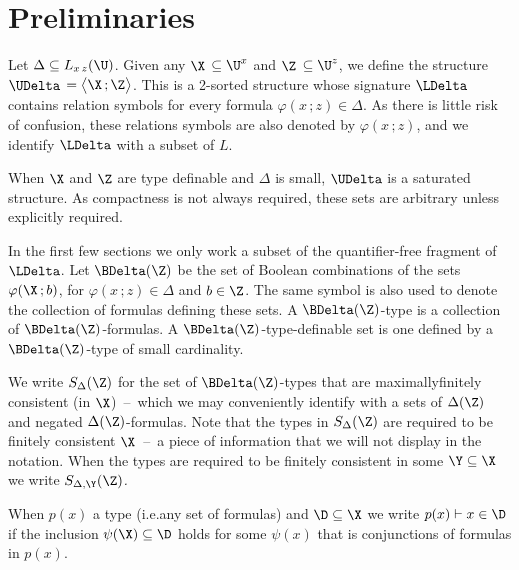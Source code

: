 \section{Preliminaries}
\label{actions}

\def\ceq#1#2#3{\noindent\parbox[t]{15ex}{$\displaystyle #1$}\parbox{6ex}{\hfil $#2$}{$\displaystyle #3$}}


Let $\Delta\subseteq L_{x\,z}(\U)$.
Given any \emph{$\X$\/} $\subseteq\U^x$ and \emph{$\Z$\/} $\subseteq\U^z$, we define the structure \emph{$\UDelta$\/} $=\big\langle\X\,;\Z\big\rangle$.
This is a 2-sorted structure whose signature \emph{$\LDelta$\/} contains relation symbols for every formula $\varphi(x\,;z)\in\Delta$.
As there is little risk of confusion, these relations symbols are also denoted by $\varphi(x\,;z)$, and we identify $\LDelta$ with a subset of $L$.

When $\X$ and $\Z$ are type definable and $\Delta$ is small, $\UDelta$ is a saturated structure.
As compactness is not always required, these sets are arbitrary unless explicitly required.

In the first few sections we only work a subset of the quantifier-free fragment of $\LDelta$.
Let $\BDelta(\Z)$ be the set of Boolean combinations of the sets $\varphi(\X\,;b)$, for $\varphi(x\,;z)\in\Delta$ and $b\in\Z$.
The same symbol is also used to denote the collection of formulas defining these sets.
A $\BDelta(\Z)$-type is a collection of $\BDelta(\Z)$-formulas.
A $\BDelta(\Z)$-type-definable set is one defined by a $\BDelta(\Z)$-type of small cardinality.

We write \emph{$S_\Delta(\Z)$\/} for the set of $\BDelta(\Z)$-types that are maximallyfinitely consistent (in $\X$)~--~which we may conveniently identify with a sets of $\Delta(\Z)$ and negated $\Delta(\Z)$-formulas.
Note that the types in $S_\Delta(\Z)$ are required to be finitely consistent $\X$~--~a piece of information that we will not display in the notation.
When the types are required to be finitely consistent in some $\Y\subseteq\X$ we write \emph{$S_{\Delta,\Y}(\Z)$.}


When $p(x)$ a type (i.e.\@ any set of formulas) and $\D\subseteq\X$ we write $p(x)\vdash x\in\D$ if the inclusion $\psi(\X)\subseteq\D$ holds for some $\psi(x)$ that is conjunctions of formulas in $p(x)$.

